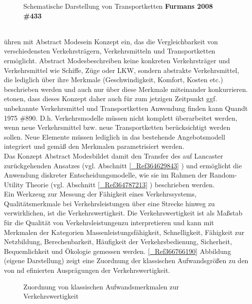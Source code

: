 \begin{figure}[htbp]
  \centering
  \caption{ Schematische Darstellung von Transportketten \textbf{{}\textbf{Furmans}\textbf{ 2008 \#433}}}
  \label{_Ref364785338}
\end{figure}
~\\
 \citeauthor{bib.890} ühren mit \glqq Abstract Modes\grqq  ein Konzept ein, das die Vergleichbarkeit von verschiedensten Verkehrsträgern, Verkehrsmitteln und Transportketten ermöglicht. \glqq Abstract Modes\grqq  beschreiben keine konkreten Verkehrsträger und Verkehrsmittel wie Schiffe, Züge oder LKW, sondern abstrakte Verkehrsmittel, die lediglich über ihre Merkmale (Geschwindigkeit, Komfort, Kosten etc.) beschrieben werden und auch nur über diese Merkmale miteinander konkurrieren.  \citeauthor{bib.890} etonen, dass dieses Konzept daher auch für zum jetzigen Zeitpunkt ggf. unbekannte Verkehrsmittel und Transportketten Anwendung finden kann {Quandt 1975 \#890}. D.h. Verkehrsmodelle müssen nicht komplett überarbeitet werden, wenn neue Verkehrsmittel bzw. neue Transportketten berücksichtigt werden sollen. Neue Elemente müssen lediglich in das bestehende Angebotsmodell integriert und gemäß den Merkmalen parametrisiert werden.~\\
Das Konzept \glqq Abstract Modes\grqq  bildet damit den Transfer des auf Lancaster zurückgehenden Ansatzes (vgl. Abschnitt \autoref{_Ref364629843} ) und ermöglicht die Anwendung diskreter Entscheidungsmodelle, wie sie im Rahmen der Random-Utility Theorie (vgl. Abschnitt \autoref{_Ref364787213} ) beschrieben werden.~\\
Ein Werkzeug zur Messung der Fähigkeit eines Verkehrssystems, \glqq Qualitätsmerkmale bei Verkehrsleistungen über eine Strecke hinweg zu verwirklichen\grqq , ist die Verkehrswertigkeit. Die Verkehrswertigkeit ist als \glqq Maßstab für die Qualität von Verkehrsleistungen\grqq  zu interpretieren  \autocites[][]{bib.740} und kann mit Merkmalen der Kategorien \glqq Massenleistungsfähigkeit, Schnelligkeit, Fähigkeit zur Netzbildung, Berechenbarkeit, Häufigkeit der Verkehrsbedienung, Sicherheit, Bequemlichkeit\grqq   \autocites[][]{bib.740} und Ökologie  \autocites[][]{bib.344} gemessen werden. \autoref{_Ref366766190} Abbildung  (eigene Darstellung) zeigt eine Zuordnung der klassischen Aufwandsgrößen zu den von  \citeauthor{bib.740} nd  \citeauthor{bib.344} efinierten Ausprägungen der Verkehrswertigkeit.~\\

\begin{figure}[htbp]
  \centering
  \caption{ Zuordnung von klassischen Aufwandsmerkmalen zur Verkehrswertigkeit}
  \label{_Ref366766190}
\end{figure}
~\\


